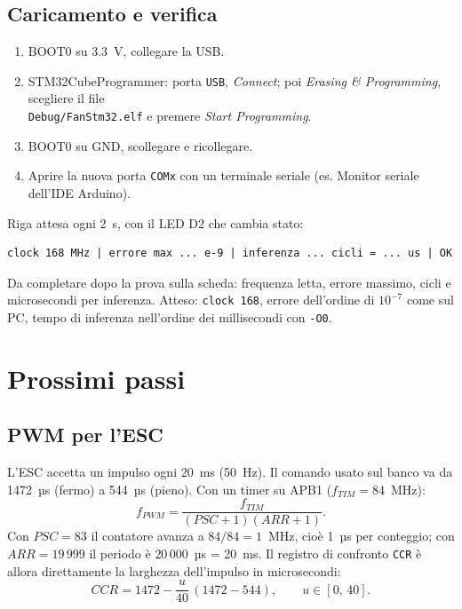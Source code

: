 \documentclass[11pt,a4paper]{article}
\newcommand{\code}[1]{\texttt{\small #1}}
\begin{document}
\subsection{Caricamento e verifica}
\begin{enumerate}
\item BOOT0 su 3.3~V, collegare la USB.
\item STM32CubeProgrammer: porta \code{USB}, \emph{Connect}; poi \emph{Erasing \& Programming},
  scegliere il file\\ \code{Debug/FanStm32.elf} e premere \emph{Start Programming}.
\item BOOT0 su GND, scollegare e ricollegare.
\item Aprire la nuova porta \code{COMx} con un terminale seriale (es. Monitor seriale dell'IDE Arduino).
\end{enumerate}
Riga attesa ogni 2~s, con il LED D2 che cambia stato:
\begin{lstlisting}[style=sh]
clock 168 MHz | errore max ... e-9 | inferenza ... cicli = ... us | OK
\end{lstlisting}
\begin{attenzione}
Da completare dopo la prova sulla scheda: frequenza letta, errore massimo, cicli e microsecondi
per inferenza. Atteso: \code{clock 168}, errore dell'ordine di $10^{-7}$ come sul PC, tempo di
inferenza nell'ordine dei millisecondi con \code{-O0}.
\end{attenzione}

\section{Prossimi passi}

\subsection{PWM per l'ESC}
L'ESC accetta un impulso ogni 20~ms (50~Hz). Il comando usato sul banco va da 1472~µs (fermo) a
544~µs (pieno). Con un timer su APB1 ($f_{TIM} = 84$~MHz):
\begin{equation}
f_{PWM} = \frac{f_{TIM}}{(PSC+1)(ARR+1)} .
\end{equation}
Con $PSC = 83$ il contatore avanza a $84/84 = 1$~MHz, cioè 1~µs per conteggio; con $ARR = 19\,999$
il periodo è $20\,000$~µs = 20~ms. Il registro di confronto \code{CCR} è allora direttamente la
larghezza dell'impulso in microsecondi:
\begin{equation}
CCR = 1472 - \frac{u}{40}\,(1472 - 544), \qquad u\in[0,\,40].
\end{equation}
\end{document}
